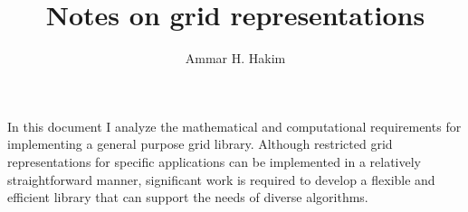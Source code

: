 \documentclass[11pt, reqno]{amsart}
\title[Grid Representation]{Notes on grid representations}%
\author{Ammar H. Hakim}%
\date{}
\theoremstyle{definition}
\begin{document}
\maketitle





In this document I analyze the mathematical and computational
requirements for implementing a general purpose grid library.
Although restricted grid representations for specific applications can
be implemented in a relatively straightforward manner, significant
work is required to develop a flexible and efficient library that can
support the needs of diverse algorithms.

\end{document}
